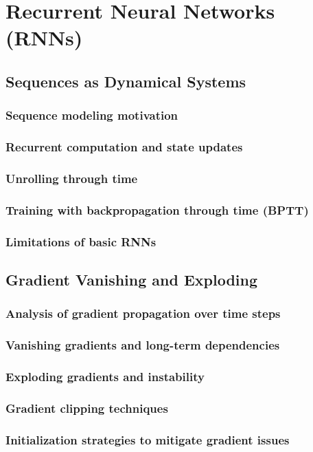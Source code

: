 ﻿\chapter{Recurrent Neural Networks (RNNs)}

\section{Sequences as Dynamical Systems}
\subsection{Sequence modeling motivation}
\subsection{Recurrent computation and state updates}
\subsection{Unrolling through time}
\subsection{Training with backpropagation through time (BPTT)}
\subsection{Limitations of basic RNNs}

\section{Gradient Vanishing and Exploding}
\subsection{Analysis of gradient propagation over time steps}
\subsection{Vanishing gradients and long-term dependencies}
\subsection{Exploding gradients and instability}
\subsection{Gradient clipping techniques}
\subsection{Initialization strategies to mitigate gradient issues}

